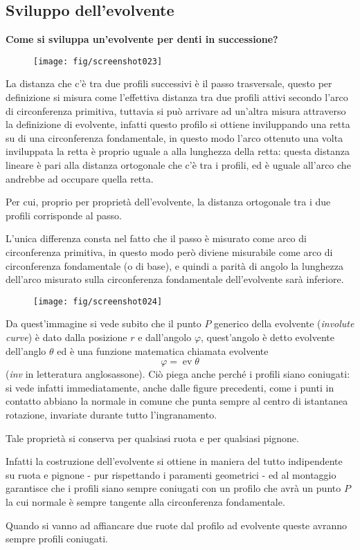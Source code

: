 \documentclass[a4paper, 15pt]{article}
\DeclareMathOperator{\ev}{ev}
\begin{document}
	\subsection{Sviluppo dell'evolvente}
	\begin{adjustwidth}{2in}{}
		\textbf{Come si sviluppa un'evolvente per denti in successione?}
		\begin{figure}[H]
			\centering
			\texttt{[image: fig/screenshot023]}
			\label{fig:screenshot023}
		\end{figure}		
		La distanza che c'è tra due profili successivi è il passo trasversale, questo per definizione si misura come l'effettiva distanza tra due profili attivi secondo l'arco di circonferenza primitiva, tuttavia si può arrivare ad un'altra misura attraverso la definizione di evolvente, infatti questo profilo si ottiene inviluppando una retta su di una circonferenza fondamentale, in questo modo l'arco ottenuto una volta inviluppata la retta è proprio uguale a alla lunghezza della retta: questa distanza lineare è pari alla distanza ortogonale che c'è tra i profili, ed è uguale all'arco che andrebbe ad occupare quella retta.
		
		Per cui, proprio per proprietà dell'evolvente, la distanza ortogonale tra i due profili corrisponde al passo. 
		
		L'unica differenza consta nel fatto che il passo è misurato come arco di circonferenza primitiva, in questo modo però diviene misurabile come arco di circonferenza fondamentale (o di base), e quindi a parità di angolo la lunghezza dell'arco misurato sulla circonferenza fondamentale dell'evolvente sarà inferiore. 
		\begin{figure}[H]
			\centering
			\texttt{[image: fig/screenshot024]}
			\label{fig:screenshot024}
		\end{figure}		
		Da quest'immagine si vede subito che il punto $P$ generico della evolvente (\textit{involute curve}) è dato dalla posizione $r$ e dall'angolo $\varphi$, quest'angolo è detto evolvente dell'anglo $\theta$  ed è una funzione matematica chiamata evolvente \[\varphi = \ev\theta\] (\textit{inv} in letteratura anglosassone).
\newpage		
		Ciò piega anche perché i profili siano coniugati: si vede infatti immediatamente, anche dalle figure precedenti, come i punti in contatto abbiano la normale in comune che punta sempre al centro di istantanea rotazione, invariate durante tutto l'ingranamento.
		
		Tale proprietà si conserva per qualsiasi ruota e per qualsiasi pignone.
		
		Infatti la costruzione dell'evolvente si ottiene in maniera del tutto indipendente su ruota e pignone - pur rispettando i paramenti geometrici - ed al montaggio garantisce che i profili siano sempre coniugati con un profilo che avrà un punto $P$ la cui normale è sempre tangente alla circonferenza fondamentale.
		
		Quando si vanno ad affiancare due ruote dal profilo ad evolvente queste avranno sempre profili coniugati.
\end{adjustwidth}
\end{document}
